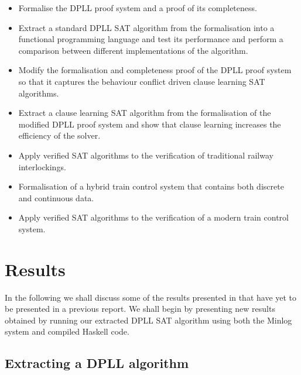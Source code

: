 \documentclass{article}
\begin{document}
\begin{itemize}

\item Formalise the DPLL proof system and a proof of its completeness.

\item Extract a standard DPLL SAT algorithm from the formalisation into a functional programming language and test its performance and perform a comparison between different implementations of the algorithm.

\item Modify the formalisation and completeness proof  of the DPLL proof system so that it captures the behaviour conflict driven clause learning SAT algorithms.

\item Extract a clause learning SAT algorithm from the formalisation  of the modified DPLL proof system and show that clause learning increases the efficiency of the solver.

\item Apply verified SAT algorithms to the verification of traditional railway interlockings. 

\item Formalisation of a hybrid train control system that contains both discrete and continuous data.

\item Apply verified SAT algorithms to the verification of a modern train control system.

\end{itemize}

\section{Results}
In the following we shall discuss some of the results presented in \cite{AL13a} that have yet to be presented in a previous report. We shall begin by presenting new results obtained by running our extracted DPLL SAT algorithm using both the Minlog system and compiled Haskell code.
\subsection*{Extracting a DPLL algorithm}
\end{document}
